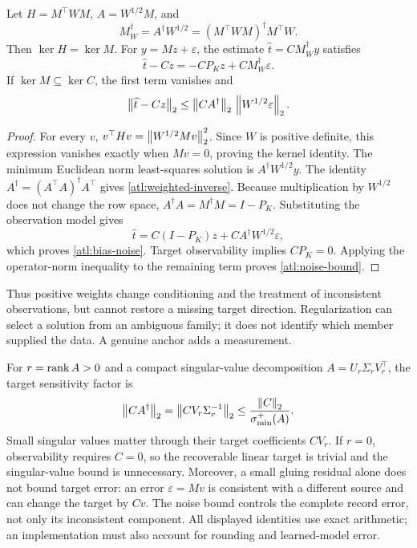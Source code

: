 \begin{proposition}
\label{atl:weighted-proposition}
Let $H=M^\top WM$, $A=W^{1/2}M$, and
\begin{equation}
  M_W^\dagger=A^\dagger W^{1/2}
  =(M^\top WM)^\dagger M^\top W.
  \label{atl:weighted-inverse}
\end{equation}
Then $\ker H=\ker M$. For $y=Mz+\varepsilon$, the estimate
$\widehat t=CM_W^\dagger y$ satisfies
\begin{equation}
  \widehat t-Cz=-CP_Kz+CM_W^\dagger\varepsilon.
  \label{atl:bias-noise}
\end{equation}
If $\ker M\subseteq\ker C$, the first term vanishes and
\begin{equation}
  \left\lVert\widehat t-Cz\right\rVert_2
  \le \left\lVert CA^\dagger\right\rVert_2\,
       \left\lVert W^{1/2}\varepsilon\right\rVert_2.
  \label{atl:noise-bound}
\end{equation}
\end{proposition}

\begin{proof}
For every $v$, $v^\top Hv=\left\lVert W^{1/2}Mv\right\rVert_2^2$. Since $W$ is positive
definite, this expression vanishes exactly when $Mv=0$, proving the kernel
identity. The minimum Euclidean norm least-squares solution is
$A^\dagger W^{1/2}y$. The identity
$A^\dagger=(A^\top A)^\dagger A^\top$ gives
\eqref{atl:weighted-inverse}. Because multiplication by $W^{1/2}$ does not
change the row space, $A^\dagger A=M^\dagger M=I-P_K$. Substituting the
observation model gives
\begin{equation*}
  \widehat t=C(I-P_K)z+CA^\dagger W^{1/2}\varepsilon,
\end{equation*}
which proves \eqref{atl:bias-noise}. Target observability implies $CP_K=0$.
Applying the operator-norm inequality to the remaining term proves
\eqref{atl:noise-bound}.
\end{proof}

Thus positive weights change conditioning and the treatment of inconsistent
observations, but cannot restore a missing target direction. Regularization
can select a solution from an ambiguous family; it does not identify which
member supplied the data. A genuine anchor adds a measurement.

For $r=\operatorname{rank} A>0$ and a compact singular-value decomposition
$A=U_r\Sigma_rV_r^\top$, the target sensitivity factor is
\begin{equation}
  \left\lVert CA^\dagger\right\rVert_2
  =\left\lVert CV_r\Sigma_r^{-1}\right\rVert_2
  \le \frac{\left\lVert C\right\rVert_2}{\sigma_{\min}^{+}(A)}.
  \label{atl:target-conditioning}
\end{equation}
Small singular values matter through their target coefficients $CV_r$.
If $r=0$, observability requires $C=0$, so the recoverable linear target is
trivial and the singular-value bound is unnecessary.
Moreover, a small gluing residual alone does not bound target error: an error
$\varepsilon=Mv$ is consistent with a different source and can change the
target by $Cv$. The noise bound controls the complete record error, not only
its inconsistent component. All displayed identities use exact arithmetic;
an implementation must also account for rounding and learned-model error.

